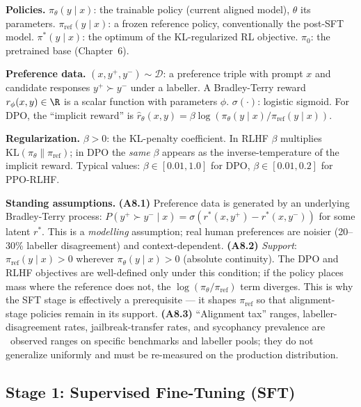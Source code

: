 \begin{notationbox}
\textbf{Policies.}
$\pi_\theta(y \mid x)$: the trainable policy (current aligned model),
$\theta$ its parameters. $\pi_{\mathrm{ref}}(y \mid x)$: a frozen
reference policy, conventionally the post-SFT model. $\pi^*(y \mid x)$:
the optimum of the KL-regularized RL objective.
$\pi_0$: the pretrained base (Chapter~6).

\textbf{Preference data.}
$(x, y^+, y^-) \sim \mathcal{D}$: a preference triple with prompt
$x$ and candidate responses $y^+ \succ y^-$ under a labeller. A
Bradley-Terry reward $r_\phi(x,y) \in \R$ is a scalar function with
parameters $\phi$. $\sigma(\cdot)$: logistic sigmoid. For DPO, the
``implicit reward'' is
$\hat r_\theta(x,y) = \beta\log(\pi_\theta(y\mid x)/\pi_{\mathrm{ref}}(y\mid x))$.

\textbf{Regularization.}
$\beta > 0$: the KL-penalty coefficient. In RLHF $\beta$ multiplies
$\mathrm{KL}(\pi_\theta \| \pi_{\mathrm{ref}})$; in DPO the
\emph{same} $\beta$ appears as the inverse-temperature of the
implicit reward. Typical values: $\beta \in [0.01, 1.0]$ for DPO,
$\beta \in [0.01, 0.2]$ for PPO-RLHF.

\textbf{Standing assumptions.}
\textbf{(A8.1)} Preference data is generated by an underlying
Bradley-Terry process: $P(y^+ \succ y^- \mid x) =
\sigma(r^*(x,y^+) - r^*(x,y^-))$ for some latent $r^*$. This is a
\emph{modelling} assumption; real human preferences are noisier
(20--30\% labeller disagreement) and context-dependent.
\textbf{(A8.2)} \emph{Support}: $\pi_{\mathrm{ref}}(y\mid x) > 0$
wherever $\pi_\theta(y\mid x) > 0$ (absolute continuity). The DPO
and RLHF objectives are well-defined only under this condition; if
the policy places mass where the reference does not, the
$\log(\pi_\theta/\pi_{\mathrm{ref}})$ term diverges. This is why
the SFT stage is effectively a prerequisite --- it shapes
$\pi_{\mathrm{ref}}$ so that alignment-stage policies remain in its
support.
\textbf{(A8.3)} ``Alignment tax'' ranges, labeller-disagreement
rates, jailbreak-transfer rates, and sycophancy prevalence are
\Emp\ observed ranges on specific benchmarks and labeller pools;
they do not generalize uniformly and must be re-measured on the
production distribution.
\end{notationbox}

\subsection{Stage 1: Supervised Fine-Tuning (SFT)}


